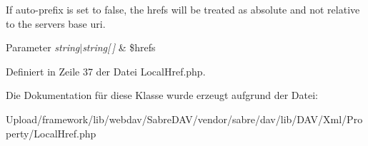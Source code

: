 If auto-\/prefix is set to false, the hrefs will be treated as absolute and not relative to the servers base uri.


\begin{DoxyParams}{Parameter}
{\em string$\vert$string\mbox{[}$\,$\mbox{]}} & \$hrefs \\
\hline
\end{DoxyParams}


Definiert in Zeile 37 der Datei Local\+Href.\+php.



Die Dokumentation für diese Klasse wurde erzeugt aufgrund der Datei\+:\begin{DoxyCompactItemize}
\item 
Upload/framework/lib/webdav/\+Sabre\+D\+A\+V/vendor/sabre/dav/lib/\+D\+A\+V/\+Xml/\+Property/Local\+Href.\+php\end{DoxyCompactItemize}
